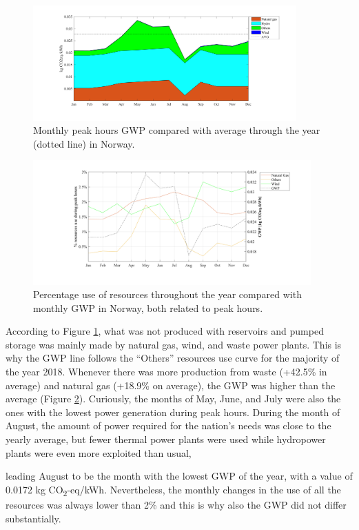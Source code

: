 {\begin{figure}[]
	\centering
	\includegraphics[width=0.9\textwidth]{ChapterLCA/Images/GWP_plots/Norway_GWP.png}
	\vspace*{-8mm}
	\caption{Monthly peak hours GWP compared with average through the year (dotted line) in Norway.}
	\label{GWP_NO}
\end{figure}

\begin{figure}[]
	\centering
	\includegraphics[width=0.95\textwidth]{ChapterLCA/Images/GWP_plots/Comp_GWP_NO.png}
    \vspace*{-8mm}
	\caption{Percentage use of resources throughout the year compared with monthly GWP in Norway, both related to peak hours.}
	\label{COMP_NO}
\end{figure}

According to Figure \ref{GWP_NO}, what was not produced with reservoirs and pumped storage was mainly  made by natural gas, wind, and waste power plants. This is why the GWP line follows the ``Others'' resources use curve for the majority of the year 2018. Whenever there was more production from waste {(+42.5\% in average)} and natural gas {(+18.9\% on average)}, the GWP was higher than the average (Figure \ref{COMP_NO}). {Curiously, the months of May, June, and July were also the ones with the lowest power generation during peak hours.} During the month of August, the amount of power required for the nation's needs was close to the yearly average, but fewer thermal power plants were used while hydropower plants were even more exploited than usual, {leading August to be the month with the lowest GWP of the year, with a value of 0.0172 kg CO\textsubscript2-eq/kWh. %
 Nevertheless, the monthly changes in the use of all the resources was always lower than 2\% and this is why also the GWP did not differ substantially. 

}}

